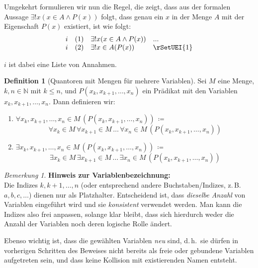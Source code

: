 \documentclass{book}
\theoremstyle{plain}
\theoremstyle{remark}
\newtheorem*{remark}{Bemerkung}
\theoremstyle{definition}
\newtheorem{definition}{Definition}[section]
\begin{document}
Umgekehrt formulieren wir nun die Regel, die zeigt, dass aus der formalen Aussage \(\exists !x(x\in A\land P(x))\) folgt, dass genau ein \(x\) in der Menge \(A\) mit der Eigenschaft \(P(x)\) existiert, ist wie folgt:
\[
\begin{array}{llll}
	i & (1) & \exists !x(x\in A\land P(x)) & ... \\
	i & (2) & \exists ! x \in A(P(x)) & \rSetUEI{1} \\
\end{array}
\]

\(i\) ist dabei eine Liste von Annahmen.

\begin{definition}[Quantoren mit Mengen für mehrere Variablen]
    Sei \( M \) eine Menge, \( k, n \in \mathbb{N} \) mit \( k \leq n \), und \( P(x_k, x_{k+1}, \ldots, x_n) \) ein Prädikat mit den Variablen \( x_k, x_{k+1}, \ldots, x_n \). Dann definieren wir:
    \begin{enumerate}
        \item \( \forall x_k, x_{k+1}, \ldots, x_n \in M \, (P(x_k, x_{k+1}, \ldots, x_n)) \)\,\(\coloneqq\)\,
        \[
            \forall x_k \in M \, \forall x_{k+1} \in M \, \ldots \, \forall x_n \in M \, (P(x_k, x_{k+1}, \ldots, x_n))
        \]
        
        \item \( \exists x_k, x_{k+1}, \ldots, x_n \in M \, (P(x_k, x_{k+1}, \ldots, x_n)) \)\,\(\coloneqq\)\,
        \[
            \exists x_k \in M \, \exists x_{k+1} \in M \, \ldots \, \exists x_n \in M \, (P(x_k, x_{k+1}, \ldots, x_n))
        \]
    \end{enumerate}
\end{definition}

\begin{remark}
\textbf{Hinweis zur Variablenbezeichnung:}\\
Die Indizes \(k, k+1, \ldots, n\) (oder entsprechend andere Buchstaben/Indizes, z.\,B.\ \(a, b, c,\ldots\)) dienen nur als Platzhalter. Entscheidend ist, dass \emph{dieselbe Anzahl} von Variablen eingeführt wird und sie \emph{konsistent} verwendet werden. Man kann die Indizes also frei anpassen, solange klar bleibt, dass sich hierdurch weder die Anzahl der Variablen noch deren logische Rolle ändert. 

Ebenso wichtig ist, dass die gewählten Variablen \emph{neu} sind, d.\,h.\ sie dürfen in vorherigen Schritten des Beweises nicht bereits als freie oder gebundene Variablen aufgetreten sein, und dass keine Kollision mit existierenden Namen entsteht.
\end{remark}
\end{document}
